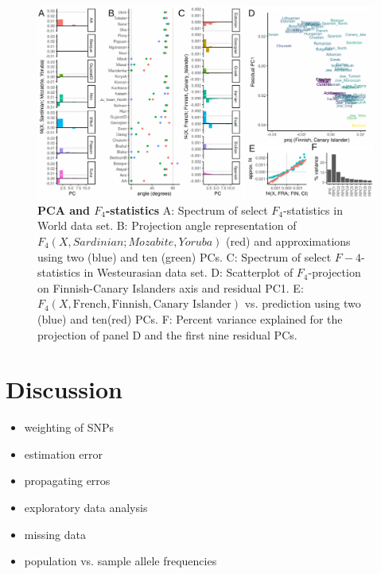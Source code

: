\documentclass[12pt,a4pape, fullpage]{article}
\begin{document}
\begin{figure}[!ht]
\includegraphics[width=\textwidth]{figures/fig_f4_data.pdf}	
	\caption{\textbf{PCA and $F_4$-statistics} A: Spectrum of select $F_4$-statistics in World data set. B: Projection angle representation of $F_4(X, Sardinian; Mozabite, Yoruba)$ (red) and approximations using two (blue) and ten (green) PCs. C: Spectrum of select $F-4$-statistics in Westeurasian data set. D: Scatterplot of $F_4$-projection on Finnish-Canary Islanders axis and residual PC1.
	E: $F_4(X, \text{French}, \text{Finnish}, \text{Canary Islander})$ vs. prediction using two (blue) and ten(red) PCs. F: Percent variance explained for the projection of panel D and the first nine residual PCs.
	}
\label{fig:f4}
\end{figure}

\section{Discussion}
\begin{itemize}
    \item weighting of SNPs
    \item estimation error
    \item propagating erros
    \item exploratory data analysis
    \item missing data
    \item population vs. sample allele frequencies
\end{itemize}

\appendix
\end{document}
